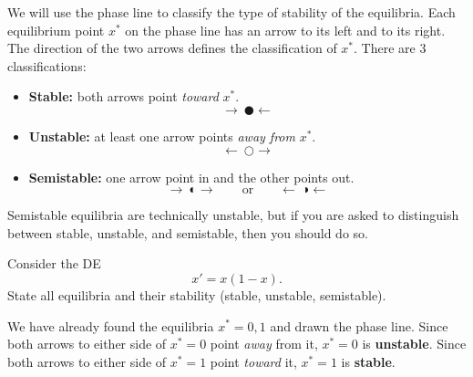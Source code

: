 \documentclass[10pt,letterpaper]{article}
\begin{document}
We will use the phase line to classify the type of stability of the equilibria. Each equilibrium point $x^*$ on the phase line has an arrow to its left and to its right. The direction of the two arrows defines the classification of $x^*$. There are 3 classifications:
\begin{itemize}
    \item \textbf{Stable:} both arrows point \emph{toward} $x^*$.
    \[
    \longrightarrow\ \CIRCLE \longleftarrow
    \]
    \item \textbf{Unstable:} at least one arrow points \emph{away from} $x^*$.
    \[
    \longleftarrow\ \Circle \longrightarrow
    \]
    \item \textbf{Semistable:} one arrow point in and the other points out.
    \[
    \longrightarrow\ \LEFTcircle \longrightarrow
    \qquad\text{or}\qquad
    \longleftarrow\ \RIGHTcircle  \longleftarrow
    \]
\end{itemize}
Semistable equilibria are technically unstable, but if you are asked to distinguish between stable, unstable, and semistable, then you should do so. 

\begin{example}[6]{
Consider the DE 
$$x' = x(1-x).$$
State all equilibria and their stability (stable, unstable, semistable). }

We have already found the equilibria $x^*=0,1$ and drawn the phase line. Since both arrows to either side of $x^*=0$ point \textit{away} from it, $x^*=0$ is \textbf{unstable}. Since both arrows to either side of $x^*=1$ point \textit{toward} it, $x^*=1$ is \textbf{stable}.

\begin{figure}[H]
    \centering
{}
\end{figure}
\end{example}
\end{document}
